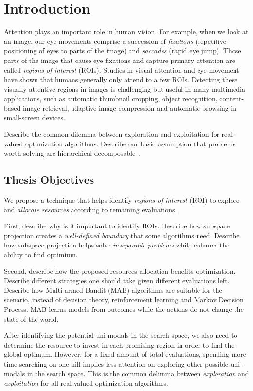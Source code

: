 \chapter{Introduction}
\label{c:intro}

Attention plays an important role in human vision. For example, when
we look at an image, our eye movements comprise a succession of {\em
fixations} (repetitive positioning of eyes to parts of the image)
and {\em saccades} (rapid eye jump). Those parts of the image that
cause eye fixations and capture primary attention are called {\em
regions of interest} (ROIs). Studies in visual attention and eye
movement have shown that humans generally only attend to a few ROIs.
Detecting these visually attentive regions in images is challenging
but useful in many multimedia applications, such as automatic
thumbnail cropping, object recognition, content-based image
retrieval, adaptive image compression and automatic browsing in
small-screen devices.

Describe the common dilemma between exploration and exploitation for real-valued optimization algorithms.
Describe our basic assumption that problems worth solving are hierarchical decomposable~\cite{herbsimon:}.

\section{Thesis Objectives}
We propose a technique that helps identify {\em regions of interest} (ROI) to explore and \textit{allocate resources} according to remaining evaluations.



First, describe why is it important to identify ROIs.
Describe how subspace projection creates a \textit{well-defined boundary} that some algorithms need.
Describe how subspace projection helps  solve \textit{inseparable problems} while enhance the ability to find optimium.

Second, describe how the proposed resources allocation benefits optimization.
Describe different strategies one should take given different evaluations left.
Describe how Multi-armed Bandit (MAB) algorithms are suitable for the scenario, instead of decision theory, reinforcement learning and Markov Decision Process.
MAB learns models from outcomes while the actions do not change the state of the world.

After identifying the potential uni-modals in the search space,
we also need to determine the resource to invest in each promising region in order to find the global optimum.
However, for a fixed amount of total evaluations, 
spending more time searching on one hill implies 
less attention on exploring other possible uni-modals in the search space.
This is the common delimma between \textit{exploration} and 
\textit{exploitation} for all real-valued optimization algorithms.


